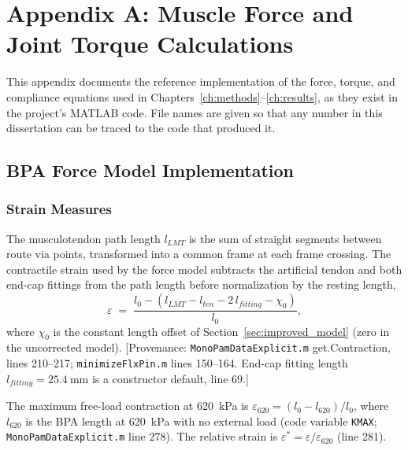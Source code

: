 \chapter{Appendix A: Muscle Force and Joint Torque Calculations}\label{app:muscle_calcs}

This appendix documents the reference implementation of the force, torque, and compliance equations used in Chapters~\ref{ch:methods}--\ref{ch:results}, as they exist in the project's MATLAB code. File names are given so that any number in this dissertation can be traced to the code that produced it.

\section{BPA Force Model Implementation}

\subsection{Strain Measures}
The musculotendon path length $l_{LMT}$ is the sum of straight segments between route via points, transformed into a common frame at each frame crossing. The contractile strain used by the force model subtracts the artificial tendon and both end-cap fittings from the path length before normalization by the resting length,
\begin{equation}
    \varepsilon \;=\; \frac{l_{0} - \left(l_{LMT} - l_{ten} - 2\,l_{fitting} - \chi_{0}\right)}{l_{0}},
    \label{eq:app_strain}
\end{equation}
where $\chi_{0}$ is the constant length offset of Section~\ref{sec:improved_model} (zero in the uncorrected model). [Provenance: \texttt{MonoPamDataExplicit.m} get.Contraction, lines 210--217; \texttt{minimizeFlxPin.m} lines 150--164. End-cap fitting length $l_{fitting}=\qty{25.4}{\mm}$ is a constructor default, line 69.]

The maximum free-load contraction at \qty{620}{\kPa} is $\varepsilon_{620} = (l_{0}-l_{620})/l_{0}$, where $l_{620}$ is the BPA length at \qty{620}{\kPa} with no external load (code variable \texttt{KMAX}; \texttt{MonoPamDataExplicit.m} line 278). The relative strain is $\varepsilon^{*} = \varepsilon / \varepsilon_{620}$ (line 281).


